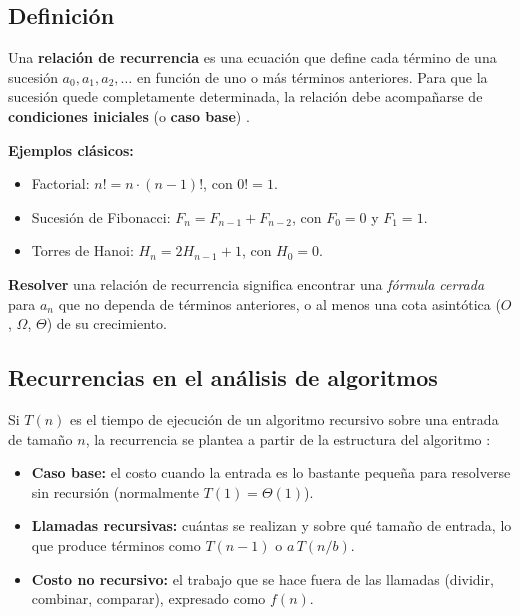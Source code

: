 \documentclass{article}
\begin{document}
        \subsection{Definición}
        
        Una \textbf{relación de recurrencia} es una ecuación que define cada término de
        una sucesión $a_0, a_1, a_2, \ldots$ en función de uno o más términos
        anteriores. Para que la sucesión quede completamente determinada, la relación
        debe acompañarse de \textbf{condiciones iniciales} (o \textbf{caso base})
        \citep{rosen2019}.
        
        \textbf{Ejemplos clásicos:}
        
        \begin{itemize}
        \item Factorial: $n! = n\cdot(n-1)!$, con $0! = 1$.
        \item Sucesión de Fibonacci: $F_n = F_{n-1} + F_{n-2}$, con $F_0 = 0$ y
                $F_1 = 1$.
        \item Torres de Hanoi: $H_n = 2H_{n-1} + 1$, con $H_0 = 0$.
        \end{itemize}
        
        \textbf{Resolver} una relación de recurrencia significa encontrar una
        \emph{fórmula cerrada} para $a_n$ que no dependa de términos anteriores, o al
        menos una cota asintótica ($O$, $\Omega$, $\Theta$) de su crecimiento.
        
        \subsection{Recurrencias en el análisis de algoritmos}
        
        Si $T(n)$ es el tiempo de ejecución de un algoritmo recursivo sobre una entrada
        de tamaño $n$, la recurrencia se plantea a partir de la estructura del
        algoritmo \citep{clrs}:
        
        \begin{itemize}
        \item \textbf{Caso base:} el costo cuando la entrada es lo bastante pequeña
                para resolverse sin recursión (normalmente $T(1) = \Theta(1)$).
        \item \textbf{Llamadas recursivas:} cuántas se realizan y sobre qué tamaño
                de entrada, lo que produce términos como $T(n-1)$ o $a\,T(n/b)$.
        \item \textbf{Costo no recursivo:} el trabajo que se hace fuera de las
                llamadas (dividir, combinar, comparar), expresado como $f(n)$.
        \end{itemize}
        
\end{document}

